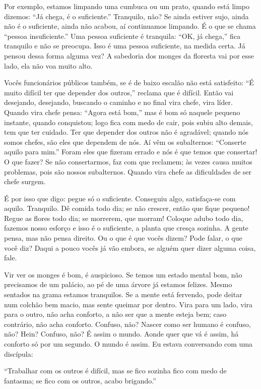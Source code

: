 Por exemplo, estamos limpando uma cumbuca ou um prato, quando está
limpo dizemos: “Já chega, é o suficiente.” Tranquilo, não? Se ainda
estiver sujo, ainda não é o suficiente, ainda não acabou, aí
continuamos limpando. É o que se chama “pessoa insuficiente.” Uma
pessoa suficiente é tranquila: “OK, já chega,” fica tranquilo e não se
preocupa. Isso é uma pessoa suficiente, na medida certa. Já pensou
dessa forma alguma vez? A sabedoria dos monges da floresta vai por esse
lado, ela não voa muito alto.

Vocês funcionários públicos também, se é de baixo escalão não está
satisfeito: “É muito difícil ter que depender dos outros,” reclama que
é difícil. Então vai desejando, desejando, buscando o caminho e no
final vira chefe, vira líder. Quando vira chefe pensa: “Agora está
bom,” mas é bom só naquele pequeno instante, quando conquistou; logo
fica com medo de cair, pois subiu alto demais, tem que ter cuidado. Ter
que depender dos outros não é agradável; quando nós somos chefes, são
eles que dependem de nós. Aí vêm os subalternos: “Conserte aquilo para
mim.” Foram eles que fizeram errado e nós é que temos que consertar! O
que fazer? Se não consertarmos, faz com que reclamem; às vezes causa
muitos problemas, pois são nossos subalternos. Quando vira chefe as
dificuldades de ser chefe surgem.

É por isso que digo: pegue só o suficiente. Conseguiu algo,
satisfaça-se com aquilo. Tranquilo. Dê comida todo dia; se não crescer,
então que fique pequeno! Regue as flores todo dia; se morrerem, que
morram! Coloque adubo todo dia, fazemos nosso esforço e isso é o
suficiente, a planta que cresça sozinha. A gente pensa, mas não pensa
direito. Ou o que é que vocês dizem? Pode falar, o que você diz? Daqui
a pouco vocês já vão embora, se alguém quer dizer alguma coisa, fale. 

Vir ver os monges é bom, é auspicioso. Se temos um estado mental
bom, não precisamos de um palácio, ao pé de uma árvore já estamos
felizes. Mesmo sentados na grama estamos tranquilos. Se a mente está
fervendo, pode deitar num colchão bem macio, mas sente queimar por
dentro. Vira para um lado, vira para o outro, não acha conforto, a não
ser que a mente esteja bem; caso contrário, não acha conforto. Confuso,
não? Nascer como ser humano é confuso, não? Hein? Confuso, não? É assim
o mundo. Aonde quer que vá é assim, há conforto só por um segundo. O
mundo é assim. Eu estava conversando com uma discípula: 

“Trabalhar com os outros é difícil, mas se fico sozinha fico com
medo de fantasma; se fico com os outros, acabo brigando.”

